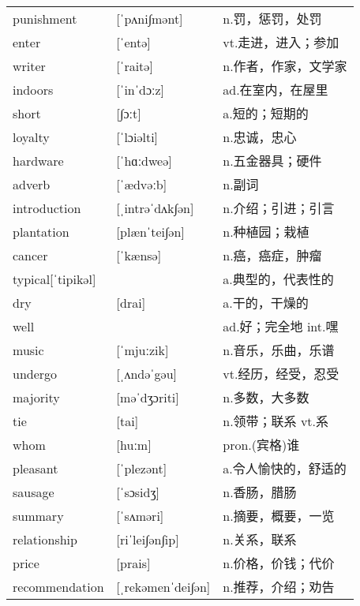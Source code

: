 \documentclass[a4paper]{article}
\begin{document}
\section{}
\begin{tabular}{l l l}

punishment & [ˈpʌni∫mənt] & n.罚，惩罚，处罚 \\
enter & [ˈentə] & vt.走进，进入；参加 \\
writer & [ˈraitə] & n.作者，作家，文学家 \\
indoors & [ˈinˈdɔːz] & ad.在室内，在屋里 \\
short & [∫ɔːt] & a.短的；短期的 \\
loyalty & [ˈlɔiəlti] & n.忠诚，忠心 \\
hardware & [ˈhɑːdweə] & n.五金器具；硬件 \\
adverb & [ˈædvəːb] & n.副词 \\
introduction & [ˌintrəˈdʌk∫ən] & n.介绍；引进；引言 \\
plantation & [plænˈtei∫ən] & n.种植园；栽植 \\
cancer & [ˈkænsə] & n.癌，癌症，肿瘤 \\
typical[ˈtipikəl] &  & a.典型的，代表性的 \\
dry & [drai] & a.干的，干燥的 \\
well &  & ad.好；完全地 int.嘿 \\
music & [ˈmjuːzik] & n.音乐，乐曲，乐谱 \\
undergo & [ˌʌndəˈgəu] & vt.经历，经受，忍受 \\
majority & [məˈdʒɔriti] & n.多数，大多数 \\
tie & [tai] & n.领带；联系 vt.系 \\
whom & [huːm] & pron.(宾格)谁 \\
pleasant & [ˈplezənt] & a.令人愉快的，舒适的 \\
sausage & [ˈsɔsidʒ] & n.香肠，腊肠 \\
summary & [ˈsʌməri] & n.摘要，概要，一览 \\
relationship & [riˈlei∫ən∫ip] & n.关系，联系 \\
price & [prais] & n.价格，价钱；代价 \\
recommendation & [ˌrekəmenˈdei∫ən] & n.推荐，介绍；劝告 \\

\end{tabular}
\end{document}
